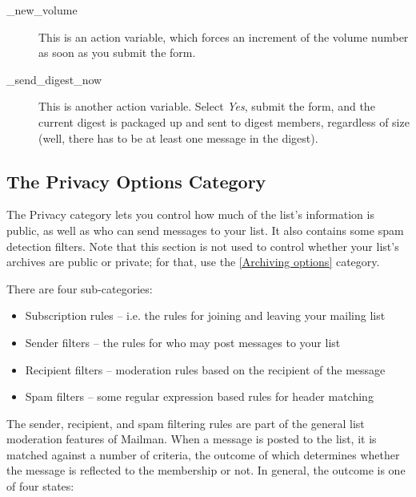 \documentclass{howto}
\begin{document}
\begin{description}
\item[_new_volume]
    This is an action variable, which forces an increment of the
    volume number as soon as you submit the form.

\item[_send_digest_now]
    This is another action variable.  Select \emph{Yes}, submit the
    form, and the current digest is packaged up and sent to digest
    members, regardless of size (well, there has to be at least one
    message in the digest).
\end{description}

\subsection{The Privacy Options Category}

The Privacy category lets you control how much of the list's
information is public, as well as who can send messages to your list.
It also contains some spam detection filters.  Note that this section
is not used to control whether your list's archives are public or
private; for that, use the \ref{Archiving options} category.

There are four sub-categories:
\begin{itemize}
\item Subscription rules -- i.e. the rules for joining and leaving
      your mailing list

\item Sender filters -- the rules for who may post messages to your
      list

\item Recipient filters -- moderation rules based on the recipient of
      the message

\item Spam filters -- some regular expression based rules for header
      matching
\end{itemize}

The sender, recipient, and spam filtering rules are part of the
general list moderation features of Mailman.  When a message is posted
to the list, it is matched against a number of criteria, the outcome
of which determines whether the message is reflected to the membership
or not.  In general, the outcome is one of four states:
\end{document}
